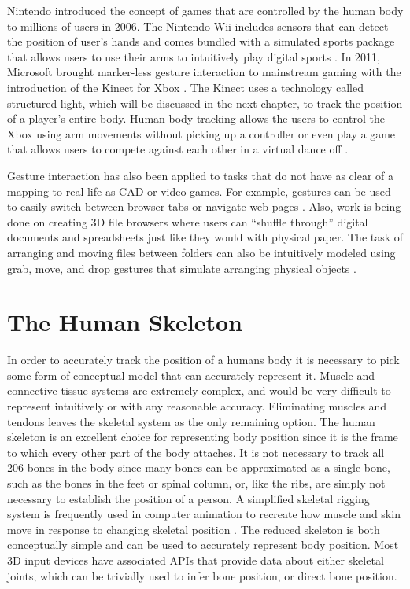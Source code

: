 Nintendo introduced the concept of games that are controlled by the human body to millions of users in 2006. The Nintendo Wii includes sensors that can detect the position of user’s hands and comes bundled with a simulated sports package that allows users to use their arms to intuitively play digital sports \cite{pasch2009movement}. In 2011, Microsoft brought marker-less gesture interaction to mainstream gaming with the introduction of the Kinect for Xbox \cite{kinectlaunch}. The Kinect uses a technology called structured light, which will be discussed in the next chapter, to track the position of a player’s entire body. Human body tracking allows the users to control the Xbox using arm movements without picking up a controller or even play a game that allows users to compete against each other in a virtual dance off \cite{zhang2012microsoft}.

Gesture interaction has also been applied to tasks that do not have as clear of a mapping to real life as CAD or video games. For example, gestures can be used to easily switch between browser tabs or navigate web pages \cite{moyle2003design}. Also, work is being done on creating 3D file browsers where users can “shuffle through” digital documents and spreadsheets just like they would with physical paper. The task of arranging and moving files between folders can also be intuitively modeled using grab, move, and drop gestures that simulate arranging physical objects \cite{dnd_interface}.

\section{The Human Skeleton}

In order to accurately track the position of a humans body it is necessary to pick some form of conceptual model that can accurately represent it. Muscle and connective tissue systems are extremely complex, and would be very difficult to represent intuitively or with any reasonable accuracy. Eliminating muscles and tendons leaves the skeletal system as the only remaining option. The human skeleton is an excellent choice for representing body position since it is the frame to which every other part of the body attaches. It is not necessary to track all 206 bones in the body since many bones can be approximated as a single bone, such as the bones in the feet or spinal column, or, like the ribs, are simply not necessary to establish the position of a person. A simplified skeletal rigging system is frequently used in computer animation to recreate how muscle and skin move in response to changing skeletal position \cite{parent2012computer}. The reduced skeleton is both conceptually simple and can be used to accurately represent body position. Most 3D input devices have associated APIs that provide data about either skeletal joints, which can be trivially used to infer bone position, or direct bone position.

